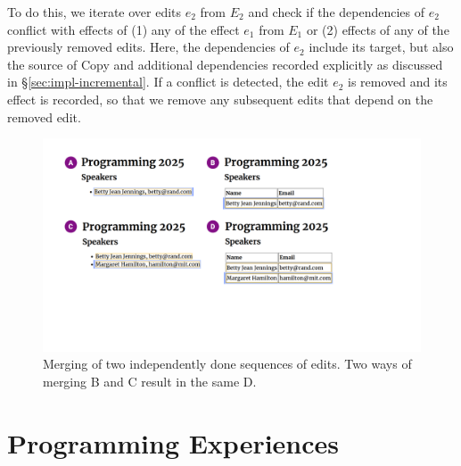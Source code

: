 \documentclass[sigconf]{acmart}
\newcommand{\note}[1]{}
\newcommand{\ident}[1]{{\sffamily #1}}
\begin{document}
To do this, we iterate over edits $e_2$ from $E_2$ and check if the dependencies of $e_2$
conflict with effects of (1) any of the effect $e_1$ from $E_1$ or (2) effects of any of the
previously removed edits. Here, the dependencies of $e_2$ include its target, but also the source
of \ident{Copy} and additional dependencies recorded explicitly as discussed in
\S\ref{sec:impl-incremental}. If a conflict is detected, the edit $e_2$ is removed and its effect
is recorded, so that we remove any subsequent edits that depend on the removed edit.



\begin{figure}[t]
\includegraphics[width=0.95\columnwidth,clip,trim=1.7cm 6cm 7.8cm 1.5cm]{fig/merging.pdf}
\caption{Merging of two independently done sequences of edits. Two ways of merging B and C result in the same D.}
\label{fig:merging}
\end{figure}


\section{Programming Experiences}
\label{sec:impl}
\end{document}
